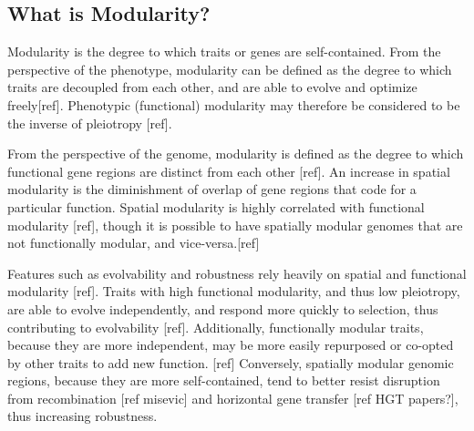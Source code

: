 \subsection{What is Modularity?}

Modularity is the degree to which traits or genes are self-contained. From the perspective of the phenotype, modularity can be defined as the degree to which traits are decoupled from each other, and are able to evolve and optimize freely[ref]. Phenotypic (functional) modularity may therefore be considered to be the inverse of pleiotropy [ref].

From the perspective of the genome, modularity is defined as the degree to which functional gene regions are distinct from each other [ref]. An increase in spatial modularity is the diminishment of overlap of gene regions that code for a particular function. Spatial modularity is highly correlated with functional modularity [ref], though it is possible to have spatially modular genomes that are not functionally modular, and vice-versa.[ref]

Features such as evolvability and robustness rely heavily on spatial and functional modularity [ref]. Traits with high functional modularity, and thus low pleiotropy, are able to evolve independently, and respond more quickly to selection, thus contributing to evolvability [ref]. Additionally, functionally modular traits, because they are more independent, may be more easily repurposed or co-opted by other traits to add new function. [ref]  Conversely, spatially modular genomic regions, because they are more self-contained, tend to better resist disruption from recombination [ref misevic] and horizontal gene transfer [ref HGT papers?], thus increasing robustness.

